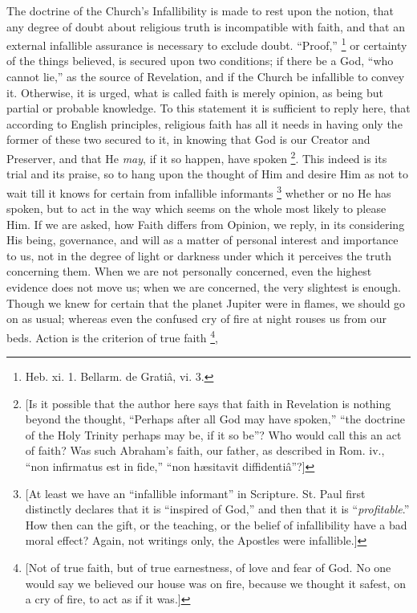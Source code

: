 The doctrine of the Church's Infallibility is made to rest upon the
notion, that any degree of doubt about religious truth is
incompatible with faith, and that an external infallible assurance is
necessary to exclude doubt. ``Proof,'' \footnote{Heb. xi. 1. Bellarm. de Gratiâ, vi. 3.} or certainty of the things believed, is secured upon two
conditions; if there be a God, ``who cannot lie,'' as the
source of Revelation, and if the Church be infallible to convey it.
Otherwise, it is urged, what is called faith is merely opinion, as
being but partial or probable knowledge. To this statement it is
sufficient to reply here, that according to English principles,
religious faith has all it needs in having only the former of these
two secured to it, in knowing that God is our Creator and Preserver,
and that He \emph{may}, if it so happen, have spoken \footnote{[Is it possible that the author here says
that faith in Revelation is nothing beyond the thought, ``Perhaps
after all God may have spoken,'' ``the doctrine of the Holy
Trinity perhaps may be, if it so be''? Who would call this an act
of faith? Was such Abraham's faith, our father, as described in Rom.
iv., ``non infirmatus est in fide,'' ``non hæsitavit
diffidentiâ''?]}. This indeed is its trial and its praise, so to hang upon the
thought of Him and desire Him as not to wait till it knows for certain
from infallible informants \footnote{[At least we have an ``infallible
informant'' in Scripture. St. Paul first distinctly declares that
it is ``inspired of God,'' and then that it is ``\emph{profitable}.''
How then can the gift, or the teaching, or the belief of infallibility
have a bad moral effect? Again, not writings only, the Apostles were
infallible.]}
whether or no He has spoken, but to act in the way which seems on the
whole most likely to please Him. If we are asked, how Faith differs
from Opinion, we reply, in its considering His being, governance, and
will as a matter of personal interest and importance to us, not in the
degree of light or darkness under which it perceives the truth
concerning them. When we are not personally concerned, even the
highest evidence does not move us; when we are concerned, the very
slightest is enough. Though we knew for certain that the planet
Jupiter were in flames, we should go on as usual; whereas even the
confused cry of fire at night rouses us from our beds. Action is
the criterion of true faith \footnote{[Not of true faith, but of true earnestness,
of love and fear of God. No one would say we believed our house was on
fire, because we thought it safest, on a cry of fire, to act as if it
was.]},
